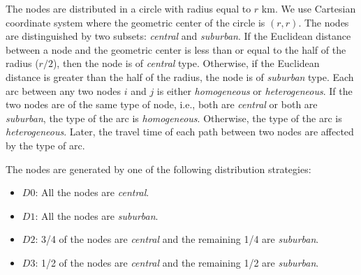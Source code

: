 The nodes are distributed in a circle with radius equal to $r$ km. We use Cartesian coordinate system where the geometric center of the circle is $(r,r)$. The nodes are distinguished by two subsets: \textit{central} and \textit{suburban}. If the Euclidean distance between a node and the geometric center is less than or equal to the half of the radius ($r/2$), then the node is of \textit{central} type. Otherwise, if the Euclidean distance is greater than the half of the radius, the node is of \textit{suburban} type. Each arc between any two nodes $i$ and $j$ is either \textit{homogeneous} or \textit{heterogeneous}. If the two nodes are of the same type of node, i.e., both are \textit{central} or both are \textit{suburban}, the type of the arc is \textit{homogeneous}. Otherwise, the type of the arc is \textit{heterogeneous}. Later, the travel time of each path between two nodes are affected by the type of arc. 

The nodes are generated by one of the following distribution strategies:
\begin{itemize}
	\item $D0$: All the nodes are \textit{central}.
	\item $D1$: All the nodes are \textit{suburban}.
	\item $D2$: 3/4 of the nodes are \textit{central} and the remaining 1/4 are \textit{suburban}.
	\item $D3$: 1/2 of the nodes are \textit{central} and the remaining 1/2 are \textit{suburban}.
\end{itemize}

